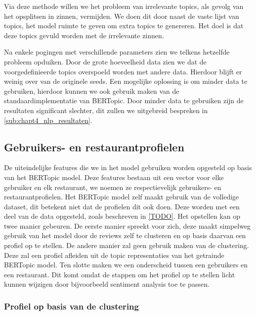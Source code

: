 Via deze methode willen we het probleem van irrelevante topics, als gevolg van het opsplitsen in zinnen, vermijden. We doen dit door naast de vaste lijst van topics, het model ruimte te geven om extra topics te genereren. Het doel is dat deze topics gevuld worden met de irrelevante zinnen.

Na enkele pogingen met verschillende parameters zien we telkens hetzelfde probleem opduiken. Door de grote hoeveelheid data zien we dat de voorgedefinieerde topics overspoeld worden met andere data. Hierdoor blijft er weinig over van de originele seeds. Een mogelijke oplossing is om minder data te gebruiken, hierdoor kunnen we ook gebruik maken van de standaardimplementatie van BERTopic. Door minder data te gebruiken zijn de resultaten significant slechter, dit zullen we uitgebreid bespreken in \autoref{sub:chapt4_nlp_resultaten}.


\subsection{Gebruikers- en restaurantprofielen}
\label{sec:chapt4_nlp_profielen}
De uiteindelijke features die we in het model gebruiken worden opgesteld op basis van het BERTopic model. Deze features bestaan uit een vector voor elke gebruiker en elk restaurant, we noemen ze respectievelijk gebruikers- en restaurantprofielen. Het BERTopic model zelf maakt gebruik van de volledige dataset, dit betekent niet dat de profielen dit ook doen. Deze worden met een deel van de data opgesteld, zoals beschreven in \autoref{TODO}. \newline
Het opstellen kan op twee manier gebeuren. De eerste manier spreekt voor zich, deze maakt simpelweg gebruik van het model door de reviews zelf te clusteren en op basis daarvan een profiel op te stellen. De andere manier zal geen gebruik maken van de clustering. Deze zal een profiel afleiden uit de topic representaties van het getrainde BERTopic model. Ten slotte maken we een onderscheid tussen een gebruikers en een restaurant. Dit komt omdat de stappen om het profiel op te stellen licht kunnen wijzigen door bijvoorbeeld sentiment analysis toe te passen.




\subsubsection{Profiel op basis van de clustering}

